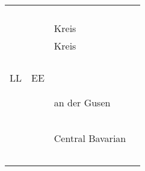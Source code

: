 \begin{table}
\begin{tabularx}{\textwidth}{llQQ}
   &    &                         &\citet{Gütter1962a}       \\
   &    &                    &\citet{Gütter1962b}       \\
   &    &                   &\citet{Gütter1963a}       \\
   &    &                &\citet{Schödel1967}       \\
   &    & Kreis             &\citet{BethgeBonnin1969}  \\
   &    & Kreis             &\citet{BethgeBonnin1969}  \\
   &    &           &\citet{Denz1977}          \\
   &    &                 &\citet{Manherz1977}       \\
   &    &                       &\citet{Bachmann2000}      \\
   &    &          &\citet{Noelliste2017}\\
LL & EE &               & \citet{Gradl1895}       \\
   &    &                       &\citet{Gartner1900}       \\
   &    &                     &\citet{Seemüller1908a}    \\
   &    &   an der Gusen   &\citet{Seemüller1909a}    \\
   &    &                   &\citet{Seemüller1909b}    \\
   &    &                    &\citet{Pfalz1911}         \\
   &    &                  &\citet{Bíró1918}          \\
   &    &                &\citet{Haasbauer1924}     \\
   &    &                   &\citet{Kubitschek1926}    \\
   &    & Central Bavarian                 &\citet{Kufner1960}        \\
   &    &                     &\citet{Gütter1963b}       \\
   &    &                       &\citet{BethgeBonnin1969}  \\
   &    &                    &\citet{Zehetner1978}      \\
   &    &                         &\citet{Moosmüller1991}\\
\lspbottomrule
\end{tabularx}
\end{table}

